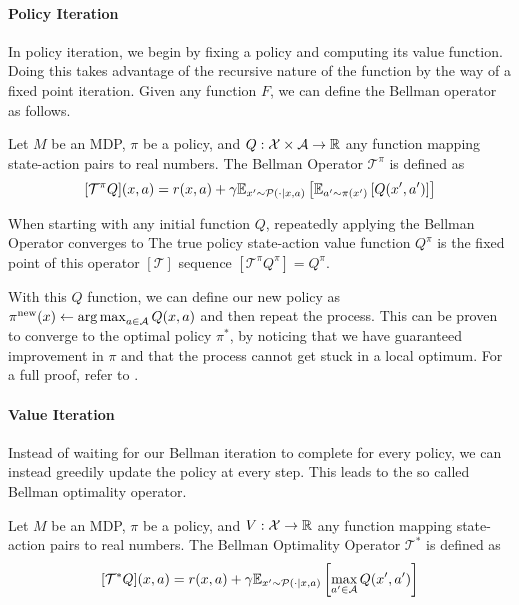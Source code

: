 \paragraph{Policy Iteration}

In policy iteration, we begin by fixing a policy and computing its value function.
Doing this takes advantage of the recursive nature of the function by the way of a fixed point iteration.
Given any function $F$, we can define the Bellman operator as follows.

\begin{definition}
    Let $M$ be an MDP, $\pi$ be a policy, and $Q: \mathcal{X} \times \mathcal{A} \rightarrow \mathbb{R}$ any function mapping state-action pairs to real numbers.
    The Bellman Operator $\mathcal{T}^\pi$ is defined as
    $$[\mathcal{T}^\pi Q](x,a) = r(x,a) + \gamma \mathbb{E}_{x'\sim \mathcal{P}(\cdot|x,a)}\left[\mathbb{E}_{a'\sim\pi(x')}\left[Q(x',a')\right]\right]$$
\end{definition}

When starting with any initial function $Q$, repeatedly applying the Bellman Operator converges to 
The true policy state-action value function $Q^\pi$ is the fixed point of this operator $[\mathcal{T}]$ sequence $[\mathcal{T}^\pi Q^\pi] = Q^\pi$.

With this $Q$ function, we can define our new policy as $\pi^\mathrm{new}(x) \leftarrow \operatorname*{arg\,max}_{a\in\mathcal{A}} Q(x,a)$ and then repeat the process.
This can be proven to converge to the optimal policy $\pi^*$, by noticing that we have guaranteed improvement in $\pi$ and that the process cannot get stuck in a local optimum.
For a full proof, refer to \textcite{farahmand2021}.

\paragraph{Value Iteration}

Instead of waiting for our Bellman iteration to complete for every policy, we can instead greedily update the policy at every step.
This leads to the so called Bellman optimality operator.

\begin{definition}
    Let $M$ be an MDP, $\pi$ be a policy, and $V: \mathcal{X} \rightarrow \mathbb{R}$ any function mapping state-action pairs to real numbers.
    The Bellman Optimality Operator $\mathcal{T}^*$ is defined as
    $$[\mathcal{T}^* Q](x,a) = r(x,a) + \gamma \mathbb{E}_{x'\sim \mathcal{P}(\cdot|x,a)}\left[\max_{a' \in \mathcal{A}}Q(x',a')\right]$$
\end{definition}


